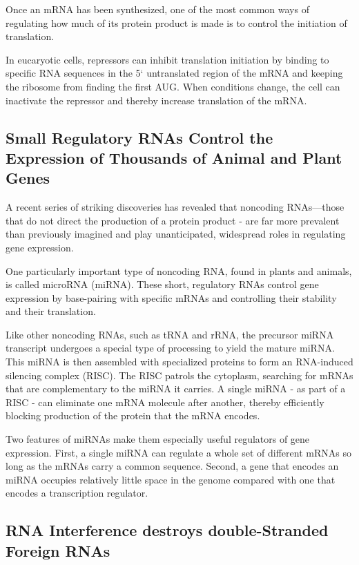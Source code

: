 Once an mRNA has been synthesized, one of the most common ways of
regulating how much of its protein product is made is to control the initiation of translation.

In eucaryotic cells, repressors can inhibit translation initiation by binding 
to specific RNA sequences in the 5` untranslated region of the mRNA
and keeping the ribosome from finding the first AUG. When conditions
change, the cell can inactivate the repressor and thereby increase translation of the mRNA.

\subsection{Small Regulatory RNAs Control the Expression of Thousands of Animal and Plant Genes}

A recent series of striking discoveries has revealed
that noncoding RNAs—those that do not direct the production of a protein 
product - are far more prevalent than previously imagined and play
unanticipated, widespread roles in regulating gene expression.

One particularly important type of noncoding RNA, found in plants and
animals, is called microRNA (miRNA). These short, regulatory RNAs control
gene expression by base-pairing with specific mRNAs and controlling
their stability and their translation.

Like other noncoding RNAs, such as tRNA and rRNA, the precursor
miRNA transcript undergoes a special type of processing to yield the
mature miRNA. This miRNA is then assembled with specialized proteins
to form an RNA-induced silencing complex (RISC). The RISC patrols the
cytoplasm, searching for mRNAs that are complementary to the miRNA
it carries. A single miRNA - as part of a RISC - 
can eliminate one mRNA molecule after another, thereby efficiently 
blocking production of the protein that the mRNA encodes.

Two features of miRNAs make them especially useful regulators of gene
expression. First, a single miRNA can regulate a whole set of different
mRNAs so long as the mRNAs carry a common sequence.
Second, a gene that encodes an miRNA occupies relatively little space in
the genome compared with one that encodes a transcription regulator.

\subsection{RNA Interference destroys double-Stranded Foreign RNAs}

